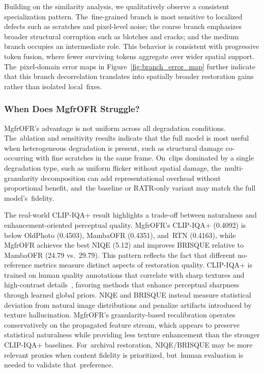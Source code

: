 \documentclass[symmetry,article,accept,pdftex,moreauthors]{Definitions/mdpi}
\begin{document}
Building on the similarity analysis, we qualitatively observe a consistent specialization pattern. The~fine-grained branch is most sensitive to localized defects such as scratches and pixel-level noise; the coarse branch emphasizes broader structural corruption such as blotches and cracks; and the medium branch occupies an intermediate role. This behavior is consistent with progressive token fusion, where fewer surviving tokens aggregate over wider spatial support. The~pixel-domain error maps in Figure~\ref{fig:branch_error_map} further indicate that this branch decorrelation translates into spatially broader restoration gains rather than isolated local~fixes.

\subsubsection{When Does MgfrOFR Struggle?}
\label{subsec:failure}

MgfrOFR's advantage is not uniform across all degradation conditions. The~ablation and sensitivity results indicate that the full model is most useful when heterogeneous degradation is present, such as structural damage co-occurring with fine scratches in the same frame. On~clips dominated by a single degradation type, such as uniform flicker without spatial damage, the~multi-granularity decomposition can add representational overhead without proportional benefit, and~the baseline or RATR-only variant may match the full model's~fidelity.

The real-world CLIP-IQA+ result highlights a trade-off between naturalness and enhancement-oriented perceptual quality. MgfrOFR's CLIP-IQA+ (0.4092) is below OldPhoto (0.4503), MambaOFR (0.4351), and~RTN (0.4163), while MgfrOFR achieves the best NIQE (5.12) and improves BRISQUE relative to MambaOFR (24.79 vs.\ 29.79). This pattern reflects the fact that different no-reference metrics measure distinct aspects of restoration quality. CLIP-IQA+ is trained on human quality annotations that correlate with sharp textures and high-contrast details~\cite{wang2023clipiqa}, favoring methods that enhance perceptual sharpness through learned global priors. NIQE and BRISQUE instead measure statistical deviation from natural image distributions and penalize artifacts introduced by texture hallucination. MgfrOFR's granularity-based recalibration operates conservatively on the propagated feature stream, which appears to preserve statistical naturalness while providing less texture enhancement than the stronger CLIP-IQA+ baselines. For~archival restoration, NIQE/BRISQUE may be more relevant proxies when content fidelity is prioritized, but~human evaluation is needed to validate that~preference.
\end{document}
